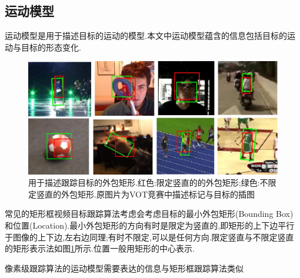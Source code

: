 \subsection{运动模型}
运动模型是用于描述目标的运动的模型.本文中运动模型蕴含的信息包括目标的运动与目标的形态变化.
\par
\begin{figure}[htbp!]
    \centering
    \includegraphics[width = 1.\textwidth]{chap/img/overlap_examples.pdf}
    \caption{用于描述跟踪目标的外包矩形.红色:限定竖直的的外包矩形;绿色:不限定竖直的外包矩形.原图片为VOT竞赛中描述标记与目标的插图\supercite{VOT_TPAMI}}\label{fig:bunding_boxes}
\end{figure}
\par
常见的矩形框视频目标跟踪算法考虑会考虑目标的最小外包矩形(Bounding Box)和位置(Location).最小外包矩形的方向有时是限定为竖直的,即矩形的上下边平行于图像的上下边,左右边同理;有时不限定,可以是任何方向.限定竖直与不限定竖直的矩形表示法如图\ref{fig:bunding_boxes}所示.位置一般用矩形的中心表示.
\par
像素级跟踪算法的运动模型需要表达的信息与矩形框跟踪算法类似